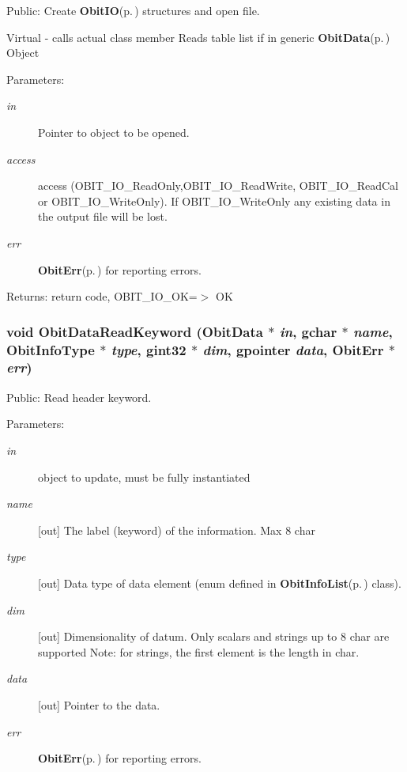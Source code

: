 Public: Create {\bf Obit\-IO}{\rm (p.\,\pageref{structObitIO})} structures and open file. 

Virtual - calls actual class member Reads table list if in generic {\bf Obit\-Data}{\rm (p.\,\pageref{structObitData})} Object \begin{Desc}
\item[Parameters:]
\begin{description}
\item[{\em in}]Pointer to object to be opened. \item[{\em access}]access (OBIT\_\-IO\_\-Read\-Only,OBIT\_\-IO\_\-Read\-Write, OBIT\_\-IO\_\-Read\-Cal or OBIT\_\-IO\_\-Write\-Only). If OBIT\_\-IO\_\-Write\-Only any existing data in the output file will be lost. \item[{\em err}]{\bf Obit\-Err}{\rm (p.\,\pageref{structObitErr})} for reporting errors. \end{description}
\end{Desc}
\begin{Desc}
\item[Returns:]return code, OBIT\_\-IO\_\-OK=$>$ OK \end{Desc}
\subsubsection{\setlength{\rightskip}{0pt plus 5cm}void Obit\-Data\-Read\-Keyword ({\bf Obit\-Data} $\ast$ {\em in}, gchar $\ast$ {\em name}, Obit\-Info\-Type $\ast$ {\em type}, gint32 $\ast$ {\em dim}, gpointer {\em data}, {\bf Obit\-Err} $\ast$ {\em err})}\label{ObitData_8c_a28}


Public: Read header keyword. 

\begin{Desc}
\item[Parameters:]
\begin{description}
\item[{\em in}]object to update, must be fully instantiated \item[{\em name}][out] The label (keyword) of the information. Max 8 char \item[{\em type}][out] Data type of data element (enum defined in {\bf Obit\-Info\-List}{\rm (p.\,\pageref{structObitInfoList})} class). \item[{\em dim}][out] Dimensionality of datum. Only scalars and strings up to 8 char are supported Note: for strings, the first element is the length in char. \item[{\em data}][out] Pointer to the data. \item[{\em err}]{\bf Obit\-Err}{\rm (p.\,\pageref{structObitErr})} for reporting errors. \end{description}
\end{Desc}
